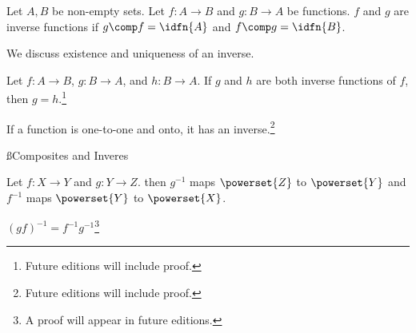 Let $A, B$ be non-empty sets.
Let $f: A \to B$ and $g: B \to A$
be functions.
$f$ and $g$ are inverse functions
if $g \comp f = \idfn{A}$
and $f \comp g = \idfn{B}$.


We discuss existence and
uniqueness of an inverse.

\begin{prop}[Uniqueness]
  Let $f: A \to B$,
  $g: B \to A$,
  and $h: B \to A$.
  If $g$ and $h$
  are both inverse
  functions of $f$,
  then $g = h$.\footnote{Future editions will include proof.}
\end{prop}

\begin{prop}[Existence]
  If a function is one-to-one
  and onto, it has an inverse.\footnote{Future editions will include proof.}
\end{prop}

\ss{Composites and Inveres}

  Let $f: X \to Y$ and $g: Y \to Z$.
  then $g^{-1}$ maps $\powerset{Z}$ to $\powerset{Y}$ and $f^{-1}$ maps $\powerset{Y}$ to $\powerset{X}$.

\begin{proposition}
  $(gf)^{-1} = f^{-1}g^{-1}$\footnote{A proof will appear in future editions.}
\end{proposition}


%

%
